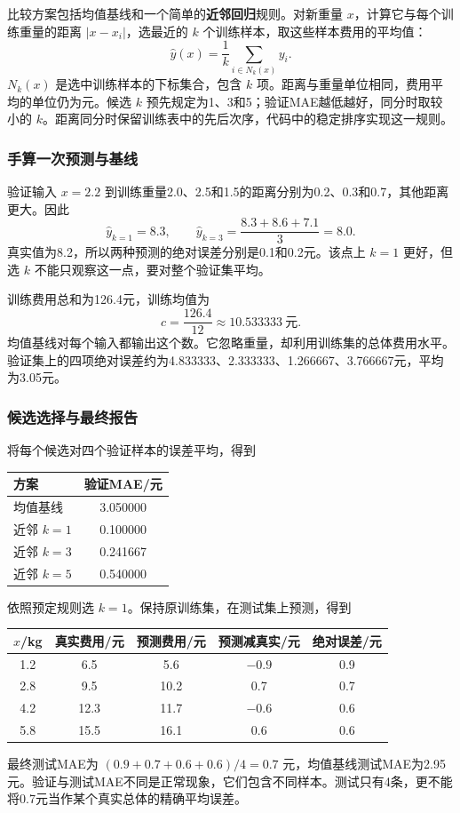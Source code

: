 \documentclass[UTF8,fontset=none,zihao=-4,a4paper]{ctexart}
\newcommand{\term}[1]{\textbf{#1}}
\numberwithin{equation}{section}
\numberwithin{figure}{section}
\begin{document}
比较方案包括均值基线和一个简单的\term{近邻回归}规则。对新重量 $x$，计算它与每个训练重量的距离 $|x-x_i|$，选最近的 $k$ 个训练样本，取这些样本费用的平均值：
\[
 \widehat y(x)=\frac1k\sum_{i\in N_k(x)}y_i.
\]
$N_k(x)$ 是选中训练样本的下标集合，包含 $k$ 项。距离与重量单位相同，费用平均的单位仍为元。候选 $k$ 预先规定为1、3和5；验证MAE越低越好，同分时取较小的 $k$。距离同分时保留训练表中的先后次序，代码中的稳定排序实现这一规则。

\subsubsection{手算一次预测与基线}
验证输入 $x=2.2$ 到训练重量2.0、2.5和1.5的距离分别为0.2、0.3和0.7，其他距离更大。因此
\[
 \widehat y_{k=1}=8.3,\qquad
 \widehat y_{k=3}=\frac{8.3+8.6+7.1}{3}=8.0.
\]
真实值为8.2，所以两种预测的绝对误差分别是0.1和0.2元。该点上 $k=1$ 更好，但选 $k$ 不能只观察这一点，要对整个验证集平均。

训练费用总和为126.4元，训练均值为
\[
 c=\frac{126.4}{12}\approx10.533333\ \text{元}.
\]
均值基线对每个输入都输出这个数。它忽略重量，却利用训练集的总体费用水平。验证集上的四项绝对误差约为4.833333、2.333333、1.266667、3.766667元，平均为3.05元。

\subsubsection{候选选择与最终报告}
将每个候选对四个验证样本的误差平均，得到
\begin{center}
\begin{tabular}{lc}
\toprule
方案 & 验证MAE/元\\\midrule
均值基线 & 3.050000\\
近邻 $k=1$ & 0.100000\\
近邻 $k=3$ & 0.241667\\
近邻 $k=5$ & 0.540000\\\bottomrule
\end{tabular}
\end{center}
依照预定规则选 $k=1$。保持原训练集，在测试集上预测，得到
\begin{center}
\begin{tabular}{ccccc}
\toprule
$x$/kg & 真实费用/元 & 预测费用/元 & 预测减真实/元 & 绝对误差/元\\\midrule
1.2 & 6.5 & 5.6 & $-0.9$ & 0.9\\
2.8 & 9.5 & 10.2 & 0.7 & 0.7\\
4.2 & 12.3 & 11.7 & $-0.6$ & 0.6\\
5.8 & 15.5 & 16.1 & 0.6 & 0.6\\\bottomrule
\end{tabular}
\end{center}
最终测试MAE为 $(0.9+0.7+0.6+0.6)/4=0.7$ 元，均值基线测试MAE为2.95元。验证与测试MAE不同是正常现象，它们包含不同样本。测试只有4条，更不能将0.7元当作某个真实总体的精确平均误差。
\end{document}
